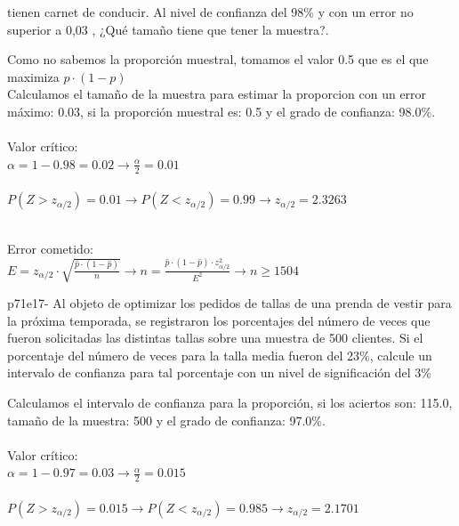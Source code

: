 \documentclass[spanish, 11pt]{exam}
\begin{document}
\begin{questions}
tienen carnet de conducir. Al nivel de confianza del 98\% y con un error no superior a 0,03 , ¿Qué tamaño
tiene que tener la muestra?. \begin{solution}   Como no sabemos la proporción muestral, tomamos el valor 0.5 que es el que maximiza $p \cdot (1 -p)$ \\ Calculamos el tamaño de la muestra para estimar la proporcion con un error máximo: 0.03, si la proporción muestral es: 0.5 y el grado de confianza: 98.0\%. \\ \\ Valor crítico: \\ $\alpha=1-0.98=0.02\to \frac{\alpha}{2}=0.01$ \\ \\ $P(Z>z_{\alpha/2})=0.01\to P(Z<z_{\alpha/2})=0.99 \to z_{\alpha/2} =2.3263$ \\ 
     \\
    Error cometido: \\ $E=z_{\alpha / 2}\cdot \sqrt{\frac{\widehat{p}\cdot\left(1-\widehat{p} \right)}{n}} \to n =\frac{\widehat{p}\cdot\left(1-\widehat{p} \right)\cdot z_{\alpha / 2}^2}{E^2} \to n \geq1504$ \\    \end{solution}\question p71e17- Al objeto de optimizar los pedidos de tallas de una prenda de vestir para la próxima temporada, se
registraron los porcentajes del número de veces que fueron solicitadas las distintas tallas sobre una muestra de
500 clientes. Si el porcentaje del número de veces para la talla media fueron del 23\%, calcule un intervalo de
confianza para tal porcentaje con un nivel de significación del 3\% \begin{solution}   Calculamos el intervalo de confianza para la proporción, si los aciertos son: 115.0, tamaño de la muestra: 500 y el grado de confianza: 97.0\%. \\ \\ Valor crítico: \\ $\alpha=1-0.97=0.03\to \frac{\alpha}{2}=0.015$ \\ \\ $P(Z>z_{\alpha/2})=0.015\to P(Z<z_{\alpha/2})=0.985 \to z_{\alpha/2} =2.1701$ \\ 

\end{solution}
\end{questions}
\end{document}
